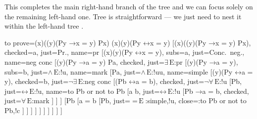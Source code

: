 \documentclass[10pt,british,a4paper,doc2]{ltxdoc}
\newcommand*{\lif}{\ensuremath{\mathbin{\rightarrow}}}
\newcommand*{\liff}{\ensuremath{\mathbin{\leftrightarrow}}}
\newcommand*{\elim}{\,\text{E}}
\begin{document}
This completes the main right-hand branch of the tree and we can focus solely on the remaining left-hand one.
Tree \nyth*{} is straightforward --- we just need to nest it within the left-hand tree \nyth[9].
\begin{latexcode}
\begin{tableau}
  {
    to prove={(\exists x)((\forall y)(Py \lif x = y) \land Px) \sststile{}{} (\exists x)(\forall y)(Py \liff x = y)}
  }
  [{(\exists x)((\forall y)(Py \lif x = y) \land Px)}, checked=a, just=Pr., name=pr
    [{\lnot (\exists x)(\forall y)(Py \liff x = y)}, subs=a, just=Conc.~neg., name=neg conc
      [{(\forall y)(Py \lif a = y) \land Pa}, checked, just=$\exists\elim$:pr
        [{(\forall y)(Py \lif a = y)}, subs=b, just=$\land\elim$:!u, name=mark
          [Pa, just=$\land\elim$:!uu, name=simple
            [{\lnot (\forall y)(Py \liff a = y)}, checked=b, just=$\lnot\exists\elim$:neg conc
              [{\lnot (Pb \liff a = b)}, checked, just=$\lnot\forall\elim$:!u
                [Pb, just=$\liff\elim$:!u, name=to Pb or not to Pb
                 [a \neq b, just=$\liff\elim$:!u
                  [{Pb \lif a = b}, checked, just=$\forall\elim$:mark%
                  ]
                ]
                ]
                [\lnot Pb
                 [{a = b}
                    [Pb, just={$=\elim$:{simple,!u}}, close={:to Pb or not to Pb,!c}
                    ]
                 ]
                ]
              ]
            ]
          ]
        ]
      ]
    ]
  ]
\end{tableau}
\end{latexcode}
\end{document}
